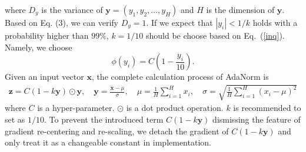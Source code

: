 \documentclass{article}
\newcommand*{\vect}[1]{\textbf{#1}}
\begin{document}
where $D_y$ is the variance of $\vect{y} = (y_1, y_2, \ldots, y_H)$ and $H$ is the dimension of $\vect{y}$.
Based on Eq. (3), we can verify $D_y = 1$. If we expect that $|y_i|<1/k$ holds with a probability higher than $99\%$, $k=1/10$ should be choose based on Eq.~(\ref{inq}). Namely, we choose
\begin{equation}
\phi(y_i)=C(1-\frac{y_i}{10}).
\end{equation}
Given an input vector $\vect{x}$, the complete calculation process of AdaNorm is
\begin{equation}\begin{aligned}
\vect{z}=C(1-{k}{\vect{y}})\odot\vect{y}, \quad
\vect{y} = \frac{\vect{x}-\mu}{\sigma}, \quad
\mu=\frac{1}{H}\sum\limits_{i=1}^Hx_i, \quad
\sigma=\sqrt{\frac{1}{H}\sum\limits_{i=1}^H(x_i-\mu)^2}
\end{aligned}\end{equation}
where $C$ is a hyper-parameter. $\odot$ is a dot product operation.  $k$ is recommended to set as $1/10$.  To prevent the introduced term $C(1-k\vect{y})$ dismissing the feature of gradient re-centering and re-scaling,  we detach the gradient of  $C(1-k\vect{y})$  and only treat it as a changeable constant in implementation. 






  





 
\begin{table}[h]
\small
\setlength{\tabcolsep}{3pt}
\centering
  \caption{Results of LayerNorm and AdaNorm. ``(+)'' means higher is better. ``(-)'' means lower is better.  AdaNorm outperforms LayerNorm on  seven datasets.  }
  \label{tab:layercomp}
  \end{table}
  
\end{document}
